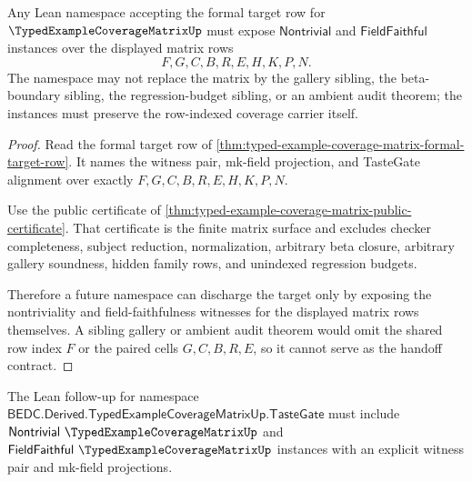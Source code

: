 \begin{theorem}
\label{thm:typed-example-coverage-matrix-lean-handoff-contract}
Any Lean namespace accepting the formal target row for $\TypedExampleCoverageMatrixUp$ must expose $\mathsf{Nontrivial}$ and $\mathsf{FieldFaithful}$ instances over the displayed matrix rows
$$
F,G,C,B,R,E,H,K,P,N .
$$
The namespace may not replace the matrix by the gallery sibling, the beta-boundary sibling, the regression-budget sibling, or an ambient audit theorem; the instances must preserve the row-indexed coverage carrier itself.
\end{theorem}
\begin{proof}
Read the formal target row of \autoref{thm:typed-example-coverage-matrix-formal-target-row}. It names the witness pair, mk-field projection, and TasteGate alignment over exactly $F,G,C,B,R,E,H,K,P,N$.

Use the public certificate of \autoref{thm:typed-example-coverage-matrix-public-certificate}. That certificate is the finite matrix surface and excludes checker completeness, subject reduction, normalization, arbitrary beta closure, arbitrary gallery soundness, hidden family rows, and unindexed regression budgets.

Therefore a future namespace can discharge the target only by exposing the nontriviality and field-faithfulness witnesses for the displayed matrix rows themselves. A sibling gallery or ambient audit theorem would omit the shared row index $F$ or the paired cells $G,C,B,R,E$, so it cannot serve as the handoff contract.
\end{proof}



The Lean follow-up for namespace $\mathsf{BEDC.Derived.TypedExampleCoverageMatrixUp.TasteGate}$ must include $\mathsf{Nontrivial}\ \TypedExampleCoverageMatrixUp$ and $\mathsf{FieldFaithful}\ \TypedExampleCoverageMatrixUp$ instances with an explicit witness pair and mk-field projections.

